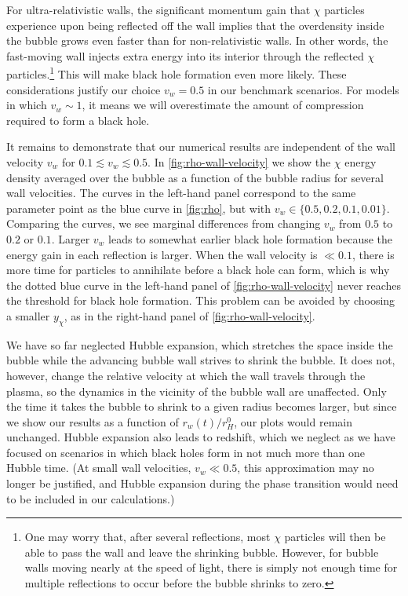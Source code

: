 \documentclass[
onecolumn, %
11pt, %
tightenlines,
superscriptaddress, %
nofootinbib, %
preprintnumbers, %
prd %
]{revtex4-1}
\begin{document}
For ultra-relativistic walls, the significant momentum gain that $\chi$ particles experience upon being reflected off the wall implies that the overdensity inside the bubble grows even faster than for non-relativistic walls. In other words, the fast-moving wall injects extra energy into its interior through the reflected $\chi$ particles.\footnote{One may worry that, after several reflections, most $\chi$ particles will then be able to pass the wall and leave the shrinking bubble. However, for bubble walls moving nearly at the speed of light, there is simply not enough time for multiple reflections to occur before the bubble shrinks to zero.} This will make black hole formation even more likely. These considerations justify our choice $v_w = 0.5$ in our benchmark scenarios. For models in which $v_w \sim 1$, it means we will overestimate the amount of compression required to form a black hole.

It remains to demonstrate that our numerical results are independent of the wall velocity $v_w$ for $0.1 \lesssim v_w \lesssim 0.5$. In \cref{fig:rho-wall-velocity} we show the $\chi$ energy density averaged over the bubble as a function of the bubble radius for several wall velocities.  The curves in the left-hand panel correspond to the same parameter point as the blue curve in \cref{fig:rho}, but with $v_w \in \{0.5, 0.2, 0.1, 0.01 \}$.  Comparing the curves, we see marginal differences from changing $v_w$ from $0.5$ to $0.2$ or $0.1$. Larger $v_w$ leads to somewhat earlier black hole formation because the energy gain in each reflection is larger.  When the wall velocity is $\ll 0.1$, there is more time for particles to annihilate before a black hole can form, which is why the dotted blue curve in the left-hand panel of \cref{fig:rho-wall-velocity} never reaches the threshold for black hole formation. This problem can be avoided by choosing a smaller $y_\chi$, as in the right-hand panel of \cref{fig:rho-wall-velocity}.

We have so far neglected Hubble expansion, which stretches the space inside the bubble while the advancing bubble wall strives to shrink the bubble.  It does not, however, change the relative velocity at which the wall travels through the plasma, so the dynamics in the vicinity of the bubble wall are unaffected. Only the time it takes the bubble to shrink to a given radius becomes larger, but since we show our results as a function of $r_w(t) / r_H^0$, our plots would remain unchanged.  Hubble expansion also leads to redshift, which we neglect as we have focused on scenarios in which black holes form in not much more than one Hubble time. (At small wall velocities, $v_w \ll 0.5$, this approximation may no longer be justified, and Hubble expansion during the phase transition would need to be included in our calculations.) 
\end{document}
